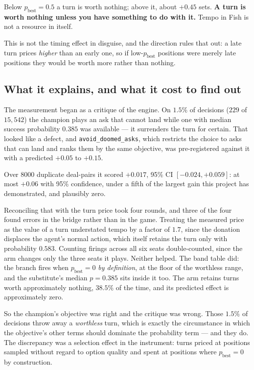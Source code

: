 \documentclass[11pt,a4paper]{article}
\begin{document}
Below $p_{\text{best}} = 0.5$ a turn is worth nothing; above it, about $+0.45$
sets. \textbf{A turn is worth nothing unless you have something to do with it.}
Tempo in Fish is not a resource in itself.

This is not the timing effect in disguise, and the direction rules that out: a
late turn prices \emph{higher} than an early one, so if low-$p_{\text{best}}$
positions were merely late positions they would be worth more rather than
nothing.

\subsection{What it explains, and what it cost to find out}

The measurement began as a critique of the engine. On $1.5\%$ of decisions
($229$ of $15{,}542$) the champion plays an ask that cannot land while one with
median success probability $0.385$ was available --- it surrenders the turn for
certain. That looked like a defect, and \texttt{avoid\_doomed\_asks}, which
restricts the choice to asks that can land and ranks them by the same
objective, was pre-registered against it with a predicted $+0.05$ to $+0.15$.

Over $8000$ duplicate deal-pairs it scored $+0.017$, 95\% CI
$[-0.024, +0.059]$: at most $+0.06$ with 95\% confidence, under a fifth of the
largest gain this project has demonstrated, and plausibly zero.

Reconciling that with the turn price took four rounds, and three of the four
found errors in the bridge rather than in the game. Treating the measured price
as the value of a turn understated tempo by a factor of $1.7$, since the
donation displaces the agent's normal action, which itself retains the turn
only with probability $0.583$. Counting firings across all six seats
double-counted, since the arm changes only the three seats it plays. Neither
helped. The band table did: the branch fires when $p_{\text{best}} = 0$
\emph{by definition}, at the floor of the worthless range, and the substitute's
median $p = 0.385$ sits inside it too. The arm retains turns worth
approximately nothing, $38.5\%$ of the time, and its predicted effect is
approximately zero.

So the champion's objective was right and the critique was wrong. Those $1.5\%$
of decisions throw away a \emph{worthless} turn, which is exactly the
circumstance in which the objective's other terms should dominate the
probability term --- and they do. The discrepancy was a selection effect in the
instrument: turns priced at positions sampled without regard to option quality
and spent at positions where $p_{\text{best}} = 0$ by construction.
\end{document}
